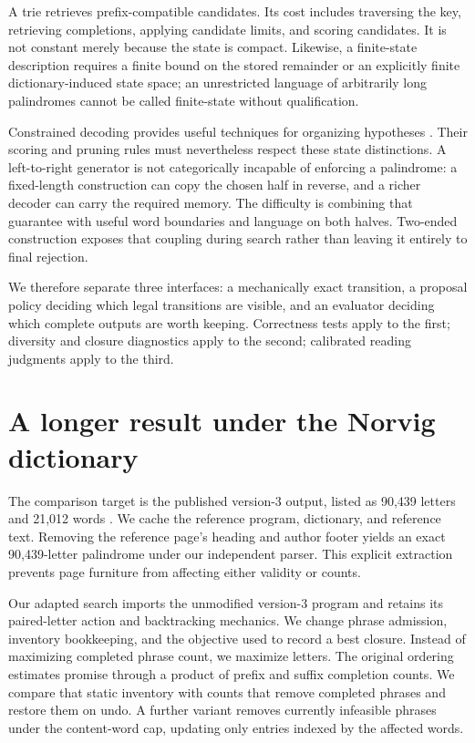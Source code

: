 \documentclass[11pt,letterpaper]{article}
\newcommand{\pageend}{\clearpage}
\begin{document}
A trie retrieves prefix-compatible candidates. Its cost includes traversing the key, retrieving completions, applying candidate limits, and scoring candidates. It is not constant merely because the state is compact. Likewise, a finite-state description requires a finite bound on the stored remainder or an explicitly finite dictionary-induced state space; an unrestricted language of arbitrarily long palindromes cannot be called finite-state without qualification.

Constrained decoding provides useful techniques for organizing hypotheses \citep{hokamp2017grid,post2018fast,lu2022astar}. Their scoring and pruning rules must nevertheless respect these state distinctions. A left-to-right generator is not categorically incapable of enforcing a palindrome: a fixed-length construction can copy the chosen half in reverse, and a richer decoder can carry the required memory. The difficulty is combining that guarantee with useful word boundaries and language on both halves. Two-ended construction exposes that coupling during search rather than leaving it entirely to final rejection.

We therefore separate three interfaces: a mechanically exact transition, a proposal policy deciding which legal transitions are visible, and an evaluator deciding which complete outputs are worth keeping. Correctness tests apply to the first; diversity and closure diagnostics apply to the second; calibrated reading judgments apply to the third.
\pageend

\section{A longer result under the Norvig dictionary}
\label{sec:length}
The comparison target is the published version-3 output, listed as 90,439 letters and 21,012 words \citep{norvig2002palindrome}. We cache the reference program, dictionary, and reference text. Removing the reference page's heading and author footer yields an exact 90,439-letter palindrome under our independent parser. This explicit extraction prevents page furniture from affecting either validity or counts.

Our adapted search imports the unmodified version-3 program and retains its paired-letter action and backtracking mechanics. We change phrase admission, inventory bookkeeping, and the objective used to record a best closure. Instead of maximizing completed phrase count, we maximize letters. The original ordering estimates promise through a product of prefix and suffix completion counts. We compare that static inventory with counts that remove completed phrases and restore them on undo. A further variant removes currently infeasible phrases under the content-word cap, updating only entries indexed by the affected words.
\end{document}
